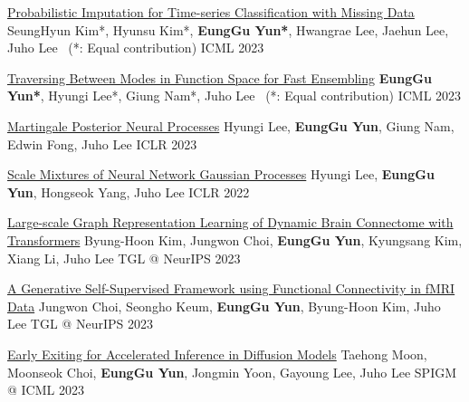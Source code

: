\documentclass[11pt, a4paper]{cv}
\begin{document}
\begin{cvsubentries}

  \cvpublication
    {\href{https://arxiv.org/abs/2308.06738}{Probabilistic Imputation for Time-series Classification with Missing Data}} %
    {SeungHyun Kim*, Hyunsu Kim*, \textbf{EungGu Yun*}, Hwangrae Lee, Jaehun Lee, Juho Lee \, (*: Equal contribution)} %
    {ICML} %
    {2023} %
    {}

  \cvpublication
    {\href{https://arxiv.org/abs/2306.11304}{Traversing Between Modes in Function Space for Fast Ensembling}} %
    {\textbf{EungGu Yun*}, Hyungi Lee*, Giung Nam*, Juho Lee \, (*: Equal contribution)} %
    {ICML} %
    {2023} %
    {}

  \cvpublication
    {\href{https://arxiv.org/abs/2304.09431}{Martingale Posterior Neural Processes}} %
    {Hyungi Lee, \textbf{EungGu Yun}, Giung Nam, Edwin Fong, Juho Lee} %
    {ICLR \small{}} %
    {2023} %
    {}

  \cvpublication
    {\href{https://arxiv.org/abs/2107.01408}{Scale Mixtures of Neural Network Gaussian Processes}} %
    {Hyungi Lee, \textbf{EungGu Yun}, Hongseok Yang, Juho Lee} %
    {ICLR} %
    {2022} %
    {}

\end{cvsubentries}

\begin{cvsubentries}

  \cvpublication
    {\href{https://arxiv.org/abs/2312.14939}{Large-scale Graph Representation Learning of Dynamic Brain Connectome with Transformers}} %
    {Byung-Hoon Kim, Jungwon Choi, \textbf{EungGu Yun}, Kyungsang Kim, Xiang Li, Juho Lee} %
    {TGL @ NeurIPS} %
    {2023} %
    {}

  \cvpublication
    {\href{https://arxiv.org/abs/2312.01994}{A Generative Self-Supervised Framework using Functional Connectivity in fMRI Data}} %
    {Jungwon Choi, Seongho Keum, \textbf{EungGu Yun}, Byung-Hoon Kim, Juho Lee} %
    {TGL @ NeurIPS} %
    {2023} %
    {}

  \cvpublication
    {\href{https://openreview.net/forum?id=nhGdjo9Xed}{Early Exiting for Accelerated Inference in Diffusion Models}} %
    {Taehong Moon, Moonseok Choi, \textbf{EungGu Yun}, Jongmin Yoon, Gayoung Lee, Juho Lee} %
    {SPIGM @ ICML} %
    {2023} %
    {}

\end{cvsubentries}
\end{document}
